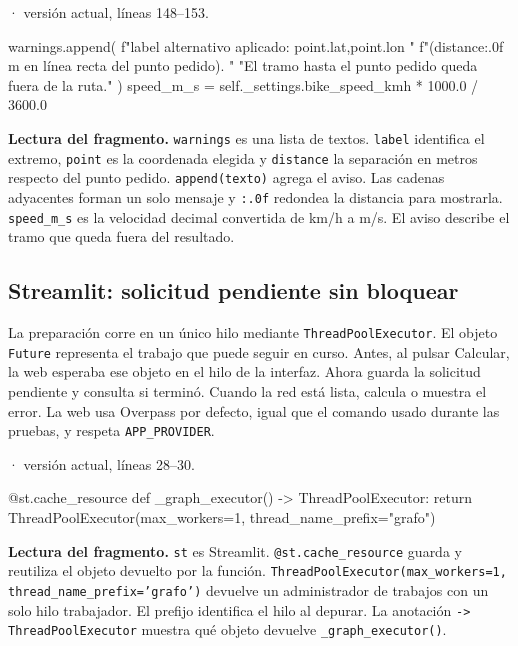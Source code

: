 \documentclass[11pt,a4paper]{article}
\begin{document}
\smallskip
{\footnotesize\texttt{} · versión actual, líneas 148--153.}\par
\begin{Codigo}[firstnumber=148]
                warnings.append(
                    f"{label} alternativo aplicado: {point.lat},{point.lon} "
                    f"({distance:.0f} m en línea recta del punto pedido). "
                    "El tramo hasta el punto pedido queda fuera de la ruta."
                )
        speed_m_s = self._settings.bike_speed_kmh * 1000.0 / 3600.0
\end{Codigo}

\textbf{Lectura del fragmento.} \texttt{warnings} es una lista de textos. \texttt{label} identifica el extremo, \texttt{point} es la coordenada elegida y \texttt{distance} la separación en metros respecto del punto pedido. \texttt{append(texto)} agrega el aviso. Las cadenas adyacentes forman un solo mensaje y \texttt{:.0f} redondea la distancia para mostrarla. \texttt{speed\_m\_s} es la velocidad decimal convertida de km/h a m/s. El aviso describe el tramo que queda fuera del resultado.


\subsection{Streamlit: solicitud pendiente sin bloquear}
La preparación corre en un único hilo mediante \texttt{ThreadPoolExecutor}. El objeto \texttt{Future} representa el trabajo que puede seguir en curso. Antes, al pulsar Calcular, la web esperaba ese objeto en el hilo de la interfaz. Ahora guarda la solicitud pendiente y consulta si terminó. Cuando la red está lista, calcula o muestra el error. La web usa Overpass por defecto, igual que el comando usado durante las pruebas, y respeta \texttt{APP\_PROVIDER}.

\smallskip
{\footnotesize\texttt{} · versión actual, líneas 28--30.}\par
\begin{Codigo}[firstnumber=28]
@st.cache_resource
def _graph_executor() -> ThreadPoolExecutor:
    return ThreadPoolExecutor(max_workers=1, thread_name_prefix="grafo")
\end{Codigo}

\textbf{Lectura del fragmento.} \texttt{st} es Streamlit. \texttt{@st.cache\_resource} guarda y reutiliza el objeto devuelto por la función. \texttt{ThreadPoolExecutor(max\_workers=1, thread\_name\_prefix='grafo')} devuelve un administrador de trabajos con un solo hilo trabajador. El prefijo identifica el hilo al depurar. La anotación \texttt{-\textgreater{} ThreadPoolExecutor} muestra qué objeto devuelve \texttt{\_graph\_executor()}.
\end{document}
